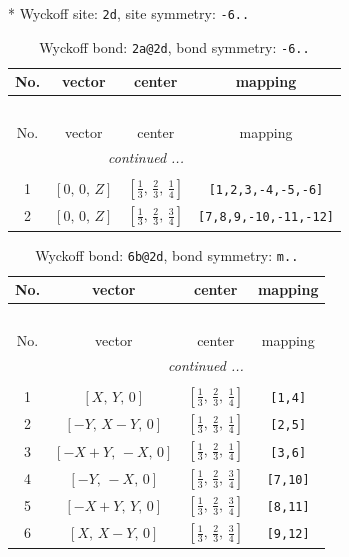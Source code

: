 \documentclass[fleqn,8pt]{jsarticle}
\begin{document}
* Wyckoff site: {\tt 2d}, site symmetry: {\tt -6..}
\renewcommand{\arraystretch}{1.2}
\begin{longtable}{cccc}
\caption{Wyckoff bond: {\tt 2a@2d}, bond symmetry: {\tt -6..}}
 \\
 \hline \hline
No. & vector & center & mapping \\ \hline \endfirsthead

\multicolumn{3}{l}{\tablename\ \thetable{}} \\
 \hline \hline
No. & vector & center & mapping \\ \hline \endhead

 \hline \hline
\multicolumn{3}{r}{\footnotesize\it continued ...} \\ \endfoot

 \hline \hline
\multicolumn{3}{r}{} \\ \endlastfoot

1 & $\left[ 0,\, 0,\, Z \right]$ & $\left[ \frac{1}{3},\, \frac{2}{3},\, \frac{1}{4} \right]$ & {\tt [1,2,3,-4,-5,-6]} \\ \hline
2 & $\left[ 0,\, 0,\, Z \right]$ & $\left[ \frac{1}{3},\, \frac{2}{3},\, \frac{3}{4} \right]$ & {\tt [7,8,9,-10,-11,-12]} \\
\end{longtable}
\renewcommand{\arraystretch}{1.2}
\begin{longtable}{cccc}
\caption{Wyckoff bond: {\tt 6b@2d}, bond symmetry: {\tt m..}}
 \\
 \hline \hline
No. & vector & center & mapping \\ \hline \endfirsthead

\multicolumn{3}{l}{\tablename\ \thetable{}} \\
 \hline \hline
No. & vector & center & mapping \\ \hline \endhead

 \hline \hline
\multicolumn{3}{r}{\footnotesize\it continued ...} \\ \endfoot

 \hline \hline
\multicolumn{3}{r}{} \\ \endlastfoot

1 & $\left[ X,\, Y,\, 0 \right]$ & $\left[ \frac{1}{3},\, \frac{2}{3},\, \frac{1}{4} \right]$ & {\tt [1,4]} \\ \hline
2 & $\left[ - Y,\, X - Y,\, 0 \right]$ & $\left[ \frac{1}{3},\, \frac{2}{3},\, \frac{1}{4} \right]$ & {\tt [2,5]} \\ \hline
3 & $\left[ - X + Y,\, - X,\, 0 \right]$ & $\left[ \frac{1}{3},\, \frac{2}{3},\, \frac{1}{4} \right]$ & {\tt [3,6]} \\ \hline
4 & $\left[ - Y,\, - X,\, 0 \right]$ & $\left[ \frac{1}{3},\, \frac{2}{3},\, \frac{3}{4} \right]$ & {\tt [7,10]} \\ \hline
5 & $\left[ - X + Y,\, Y,\, 0 \right]$ & $\left[ \frac{1}{3},\, \frac{2}{3},\, \frac{3}{4} \right]$ & {\tt [8,11]} \\ \hline
6 & $\left[ X,\, X - Y,\, 0 \right]$ & $\left[ \frac{1}{3},\, \frac{2}{3},\, \frac{3}{4} \right]$ & {\tt [9,12]} \\
\end{longtable}
\end{document}
